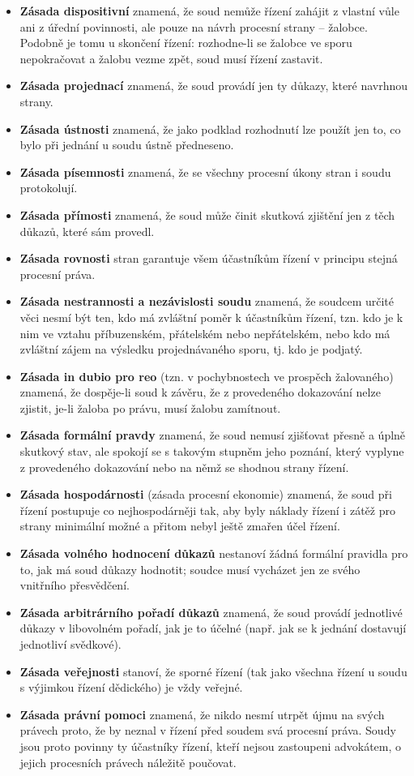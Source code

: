 \begin{itemize}
    \item \textbf{Zásada dispositivní} znamená, že soud nemůže řízení zahájit z vlastní vůle ani z úřední povinnosti, ale pouze na návrh procesní strany – žalobce. Podobně je tomu u skončení řízení: rozhodne-li se žalobce ve sporu nepokračovat a žalobu vezme zpět, soud musí řízení zastavit.
    \item \textbf{Zásada projednací} znamená, že soud provádí jen ty důkazy, které navrhnou strany.
    \item \textbf{Zásada ústnosti} znamená, že jako podklad rozhodnutí lze použít jen to, co bylo při jednání u soudu ústně předneseno.
    \item \textbf{Zásada písemnosti} znamená, že se všechny procesní úkony stran i soudu protokolují.
    \item \textbf{Zásada přímosti} znamená, že soud může činit skutková zjištění jen z těch důkazů, které sám provedl.
    \item \textbf{Zásada rovnosti} stran garantuje všem účastníkům řízení v principu stejná procesní práva.
    \item \textbf{Zásada nestrannosti a nezávislosti soudu} znamená, že soudcem určité věci nesmí být ten, kdo má zvláštní poměr k účastníkům řízení, tzn. kdo je k nim ve vztahu příbuzenském, přátelském nebo nepřátelském, nebo kdo má zvláštní zájem na výsledku projednávaného sporu, tj. kdo je podjatý.
    \item \textbf{Zásada in dubio pro reo} (tzn. v pochybnostech ve prospěch žalovaného) znamená, že dospěje-li soud k závěru, že z provedeného dokazování nelze zjistit, je-li žaloba po právu, musí žalobu zamítnout.
    \item \textbf{Zásada formální pravdy} znamená, že soud nemusí zjišťovat přesně a úplně skutkový stav, ale spokojí se s takovým stupněm jeho poznání, který vyplyne z provedeného dokazování nebo na němž se shodnou strany řízení.
    \item \textbf{Zásada hospodárnosti} (zásada procesní ekonomie) znamená, že soud při řízení postupuje co nejhospodárněji tak, aby byly náklady řízení i zátěž pro strany minimální možné a přitom nebyl ještě zmařen účel řízení.
    \item \textbf{Zásada volného hodnocení důkazů} nestanoví žádná formální pravidla pro to, jak má soud důkazy hodnotit; soudce musí vycházet jen ze svého vnitřního přesvědčení.
    \item \textbf{Zásada arbitrárního pořadí důkazů} znamená, že soud provádí jednotlivé důkazy v libovolném pořadí, jak je to účelné (např. jak se k jednání dostavují jednotliví svědkové).
    \item \textbf{Zásada veřejnosti} stanoví, že sporné řízení (tak jako všechna řízení u soudu s výjimkou řízení dědického) je vždy veřejné.
    \item \textbf{Zásada právní pomoci} znamená, že nikdo nesmí utrpět újmu na svých právech proto, že by neznal v řízení před soudem svá procesní práva. Soudy jsou proto povinny ty účastníky řízení, kteří nejsou zastoupeni advokátem, o jejich procesních právech náležitě poučovat.
\end{itemize}

